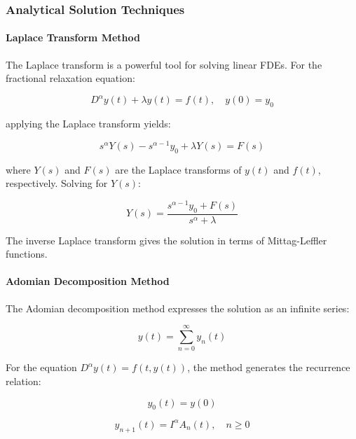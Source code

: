 \subsubsection{Analytical Solution Techniques}

\paragraph{Laplace Transform Method}

The Laplace transform is a powerful tool for solving linear FDEs. For the fractional relaxation equation:

\begin{equation}
D^{\alpha} y(t) + \lambda y(t) = f(t), \quad y(0) = y_0
\end{equation}

applying the Laplace transform yields:

\begin{equation}
s^{\alpha} Y(s) - s^{\alpha-1} y_0 + \lambda Y(s) = F(s)
\end{equation}

where $Y(s)$ and $F(s)$ are the Laplace transforms of $y(t)$ and $f(t)$, respectively. Solving for $Y(s)$:

\begin{equation}
Y(s) = \frac{s^{\alpha-1} y_0 + F(s)}{s^{\alpha} + \lambda}
\end{equation}

The inverse Laplace transform gives the solution in terms of Mittag-Leffler functions.

\paragraph{Adomian Decomposition Method}

The Adomian decomposition method expresses the solution as an infinite series:

\begin{equation}
y(t) = \sum_{n=0}^{\infty} y_n(t)
\end{equation}

For the equation $D^{\alpha} y(t) = f(t, y(t))$, the method generates the recurrence relation:

\begin{equation}
y_0(t) = y(0)
\end{equation}

\begin{equation}
y_{n+1}(t) = I^{\alpha} A_n(t), \quad n \geq 0
\end{equation}


